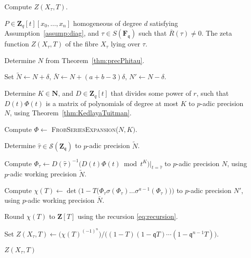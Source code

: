 \documentclass[a4paper,11pt]{article}
\numberwithin{equation}{section}
\newcommand{\NN}{\mathbf{N}} %
\newcommand{\ZZ}{\mathbf{Z}} %
\theoremstyle{definition}
\begin{document}
\begin{algorithm} 
\caption{Compute $Z(X_{\tau},T)$.}
\label{alg:complete}
\begin{algorithmic}
\vspace{1mm}
\Require $P \in \ZZ_q[t][x_0,\ldots,x_n]$ homogeneous of degree $d$ satisfying Assumption~\ref{assump:diag}, and $\tau \in S(\mathbf{F}_{\mathfrak{q}})$ such that $\overline{R}(\tau) \neq 0$.
\Ensure  The zeta function $Z(X_{\tau},T)$ of the fibre $X_{\tau}$ lying over $\tau$.
\State \begin{compactenum}[{\hspace{1em} } 1.] \vspace{-1.24em}
\item Determine $N$ from Theorem~\ref{thm:precPhitau}.
\item Set $\tilde{N} \gets N + \delta$, $\bar{N} \gets N+(a+b-3) \delta$, $N' \gets N-\delta$.
\item Determine $K \in \NN$, and $D \in \ZZ_q[t]$ that divides some power of $r$, such that $D(t) \Phi(t)$ is a matrix 
      of polynomials of degree at most $K$ to $p$-adic precision $N$, using Theorem~\ref{thm:KedlayaTuitman}.
\item Compute $\Phi \gets$ \textsc{FrobSeriesExpansion($N,K)$}.
\item Determine $\hat{\tau} \in \mathcal{S}(\ZZ_{\mathfrak{q}})$ to $p$-adic precision $\tilde{N}$.
\item Compute $\Phi_{\tau} \gets D(\hat{\tau})^{-1} \bigl( D(t) \Phi(t) \bmod{t^{K}} \bigr)|_{t=\hat{\tau}}$ 
      to $p$-adic precision $N$, using $p$-adic working precision $\tilde{N}$.
\item Compute $\chi(T) \gets \det\bigl(1-T \bigl(\Phi_{\tau} \sigma(\Phi_{\tau}) \ldots \sigma^{a-1}(\Phi_{\tau}) \bigr)  \bigr)$ to $p$-adic precision $N'$, 
      using $p$-adic working precision $\bar{N}$.
\item Round $\chi(T)$ to $\ZZ[T]$ using the recursion \eqref{eq:recursion}. 
\item Set $Z(X_{\tau},T) \gets \bigl( \chi(T)^{(-1)^n} \bigr)/\bigl((1 - T) (1 - \mathfrak{q}T) \dotsm (1 - \mathfrak{q}^{n-1}T)\bigr)$.
\item \Return $Z(X_{\tau},T)$
\end{compactenum}
\EndProcedure
\end{algorithmic}
\end{algorithm}

\end{document}
